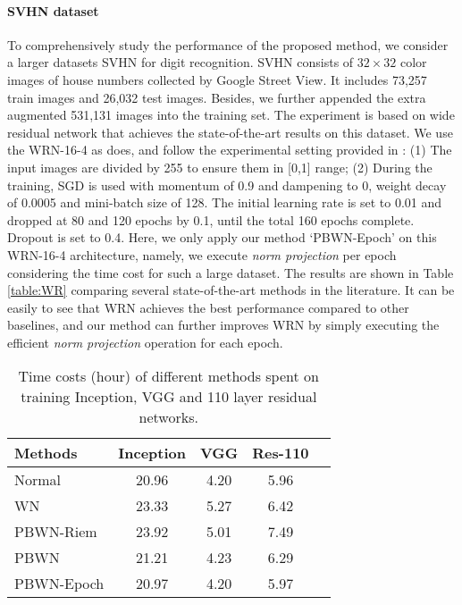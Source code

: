 \documentclass[twocolumn]{article}
\begin{document}
\paragraph{SVHN dataset}
To comprehensively study the performance of the proposed method, we consider a larger datasets SVHN \cite{2011_NIPS_Netzer} for digit recognition. SVHN consists of $32 \times 32$ color images of house numbers collected by Google Street View. It includes 73,257 train images and 26,032 test images. Besides, we further appended the extra augmented 531,131 images into the training set. The experiment is based on wide residual network that achieves the state-of-the-art results on this dataset. We use the WRN-16-4 as \cite{2016_CoRR_Zagoruyko} does, and follow the experimental setting provided in \cite{2016_CoRR_Zagoruyko}: (1) The input images are divided by 255 to ensure them in [0,1] range; (2) During the training, SGD is used with momentum of 0.9 and dampening to 0, weight decay of 0.0005 and mini-batch size of 128. The initial learning rate is set to 0.01 and dropped at 80 and 120 epochs by 0.1, until the total 160 epochs complete. Dropout is set to 0.4. Here, we only apply our method `PBWN-Epoch' on this WRN-16-4 architecture, namely, we execute \emph{norm projection} per epoch considering the time cost for such a large dataset. The results are shown in Table \ref{table:WR} comparing several state-of-the-art methods in the literature. It can be easily to see that WRN achieves the best performance compared to other baselines, and our method can further improves WRN by simply executing the efficient \emph{norm projection} operation for each epoch.
\begin{table}[t]
\caption{Time costs (hour) of different methods spent on training Inception, VGG and 110 layer residual networks.}
\label{table:TimeCost}
\vskip 0.0in
\begin{center}
\begin{small}
\begin{tabular}{lcccr}
\hline
Methods   & Inception & VGG & Res-110   \\
\hline
Normal            &  20.96   &  4.20   & 5.96    \\
WN	             &  23.33   &  5.27  &  6.42  \\
PBWN-Riem &   23.92  &  5.01  &  7.49 \\
PBWN	       &  21.21   &  4.23  &  6.29 \\
PBWN-Epoch 	 &  20.97  &  4.20  &   5.97 \\
\hline
\end{tabular}
\end{small}
\end{center}
  \vspace{-0.15in}
\end{table}
\end{document}

